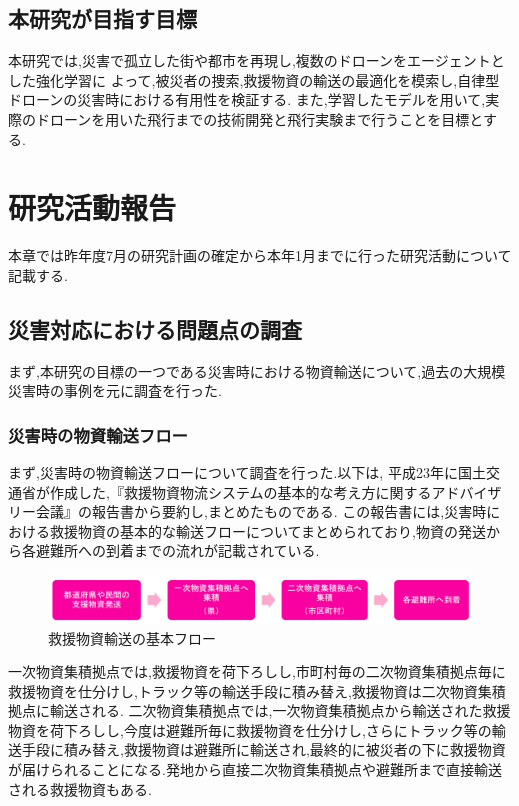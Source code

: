 \documentclass{article}[jsarticle]
\begin{document}
\subsection{本研究が目指す目標}
本研究では,災害で孤立した街や都市を再現し,複数のドローンをエージェントとした強化学習に
よって,被災者の捜索,救援物資の輸送の最適化を模索し,自律型ドローンの災害時における有用性を検証する. 
また,学習したモデルを用いて,実際のドローンを用いた飛行までの技術開発と飛行実験まで行うことを目標とする.


\section{研究活動報告}
本章では昨年度7月の研究計画の確定から本年1月までに行った研究活動について記載する.
\subsection{災害対応における問題点の調査}
まず,本研究の目標の一つである災害時における物資輸送について,過去の大規模災害時の事例を元に調査を行った.
\subsubsection{災害時の物資輸送フロー}
まず,災害時の物資輸送フローについて調査を行った.以下は, 平成23年に国土交通省が作成した,『救援物資物流システムの基本的な考え方に関するアドバイザリー会議』の報告書から要約し,まとめたものである.
この報告書には,災害時における救援物資の基本的な輸送フローについてまとめられており,物資の発送から各避難所への到着までの流れが記載されている.
\begin{figure}[H]
    \centering
    \includegraphics[width=\textwidth]{./Images/20240127180600.png}
    \caption{救援物資輸送の基本フロー}
\end{figure}
一次物資集積拠点では,救援物資を荷下ろしし,市町村毎の二次物資集積拠点毎に救援物資を仕分けし,トラック等の輸送手段に積み替え,救援物資は二次物資集積拠点に輸送される.
二次物資集積拠点では,一次物資集積拠点から輸送された救援物資を荷下ろしし,今度は避難所毎に救援物資を仕分けし,さらにトラック等の輸送手段に積み替え,救援物資は避難所に輸送され,最終的に被災者の下に救援物資が届けられることになる.発地から直接二次物資集積拠点や避難所まで直接輸送される救援物資もある.\par 
\end{document}
